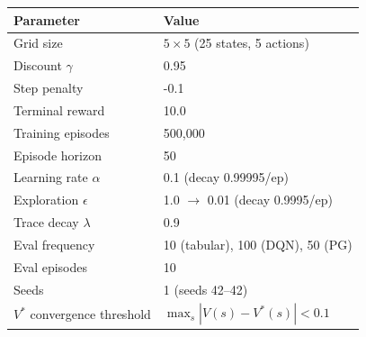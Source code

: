 \begin{tabular}{ll}
\hline
Parameter & Value \\
\hline
Grid size & $5 \times 5$ (25 states, 5 actions) \\
Discount $\gamma$ & 0.95 \\
Step penalty & -0.1 \\
Terminal reward & 10.0 \\
Training episodes & 500,000 \\
Episode horizon & 50 \\
Learning rate $\alpha$ & 0.1 (decay 0.99995/ep) \\
Exploration $\epsilon$ & 1.0 $\to$ 0.01 (decay 0.9995/ep) \\
Trace decay $\lambda$ & 0.9 \\
Eval frequency & 10 (tabular), 100 (DQN), 50 (PG) \\
Eval episodes & 10 \\
Seeds & 1 (seeds 42--42) \\
$V^*$ convergence threshold & $\max_s |V(s) - V^*(s)| < 0.1$ \\
\hline
\end{tabular}